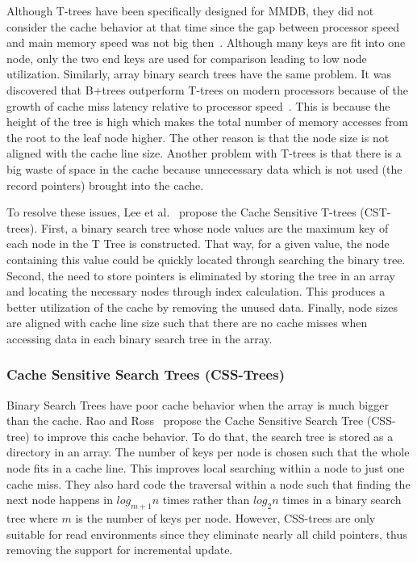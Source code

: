 \documentclass[12pt,a4paper]{article}
\begin{document}
Although T-trees have been specifically designed for MMDB, they did not consider the cache behavior at that time since the gap between processor speed and main
memory speed was not big then~\cite{rao1999cache}. Although many keys are
fit into one node, only the two end keys are used for comparison leading to low node utilization. Similarly, array binary search trees have the same problem. 
It was discovered that B+trees outperform
T-trees on modern processors because of the growth of cache miss latency relative to processor speed~\cite{rao1999cache,lee2007cst}. This is because the height
of the tree is high which makes the total number of memory accesses from the root to the leaf node higher. The other reason is that the node size is not aligned
with the cache line size. Another problem with T-trees is that there is a big waste of space in the cache because unnecessary data which is not used (the
record pointers) brought into the cache.

To resolve these issues, Lee et al.~\cite{lee2007cst} propose the Cache Sensitive T-trees (CST-trees). First, a binary
search tree whose node values are the maximum key of each node in the T Tree is constructed. That way, for a given value, the node containing this value could
be quickly located through searching the binary tree. Second, the need to store pointers is eliminated by storing the tree in an array and locating the
necessary nodes through index calculation. This produces a better utilization of the cache by removing the unused data. Finally, node sizes are aligned with
cache line size such that there are no cache misses when accessing data in each
binary search tree in the array.

\subsubsection*{Cache Sensitive Search Trees (CSS-Trees)}

Binary Search Trees have poor cache behavior when the array is much bigger than the cache. Rao and Ross~\cite{rao1999cache} propose the Cache Sensitive Search
Tree (CSS-tree) to improve this cache behavior. To do that, the search tree is stored as a directory in an array. The number of keys per node is chosen such
that the whole node fits in a cache line. This improves local searching within a node to just one cache miss. They also hard code the traversal within a node
such that finding the next node happens in $log_{m+1}n$ times rather than $log_{2}n$ times in a binary search tree where $m$ is the number of keys per node.
However, CSS-trees are only suitable for read environments since they eliminate nearly all child pointers, thus removing the support for incremental update.
\end{document}
